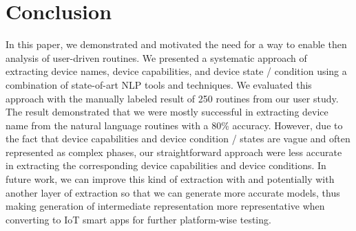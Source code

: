 \section{Conclusion}
\label{sec:conc}

In this paper, we demonstrated and motivated the need for a way to enable then analysis of user-driven routines. We presented a systematic approach of extracting device names, device capabilities, and device state / condition using a combination of state-of-art NLP tools and techniques. We evaluated this approach with the manually labeled result of 250 routines from our user study. The result demonstrated that we were mostly successful in extracting device name from the natural language routines with a 80\% accuracy. However, due to the fact that device capabilities and device condition / states are vague and often represented as complex phases, our straightforward approach were less accurate in extracting the corresponding device capabilities and device conditions. In future work, we can improve this kind of extraction with and  potentially with another layer of extraction so that we can generate more accurate models, thus making generation of intermediate representation more representative when converting to IoT smart apps for further platform-wise testing. 


